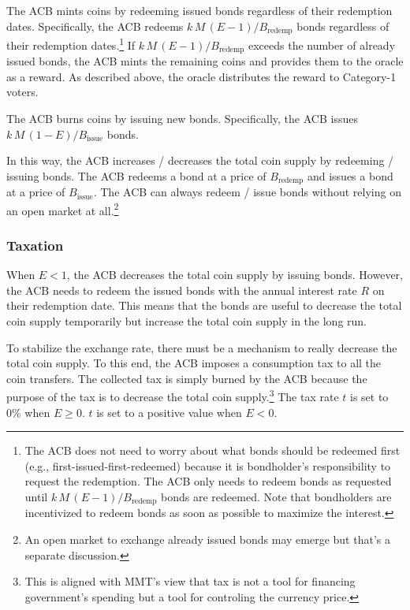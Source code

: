 \documentclass[dvipdfmx,a4paper]{article}
\begin{document}
The ACB mints coins by redeeming issued bonds regardless of their redemption dates. Specifically, the ACB redeems $k\,M\,(E-1)/B_{\mathrm{redemp}}$ bonds regardless of their redemption dates.\footnote{The ACB does not need to worry about what bonds should be redeemed first (e.g., first-issued-first-redeemed) because it is bondholder's responsibility to request the redemption. The ACB only needs to redeem bonds as requested until $k\,M\,(E-1)/B_{\mathrm{redemp}}$ bonds are redeemed. Note that bondholders are incentivized to redeem bonds as soon as possible to maximize the interest.} If $k\,M\,(E-1)/B_{\mathrm{redemp}}$ exceeds the number of already issued bonds, the ACB mints the remaining coins and provides them to the oracle as a reward. As described above, the oracle distributes the reward to Category-1 voters.

The ACB burns coins by issuing new bonds. Specifically, the ACB issues $k\,M\,(1-E)/B_{\mathrm{issue}}$ bonds.

In this way, the ACB increases / decreases the total coin supply by redeeming / issuing bonds. The ACB redeems a bond at a price of $B_{\mathrm{redemp}}$ and issues a bond at a price of $B_{\mathrm{issue}}$. The ACB can always redeem / issue bonds without relying on an open market at all.\footnote{An open market to exchange already issued bonds may emerge but that's a separate discussion.}

\subsubsection{Taxation}

When $E<1$, the ACB decreases the total coin supply by issuing bonds. However, the ACB needs to redeem the issued bonds with the annual interest rate $R$ on their redemption date. This means that the bonds are useful to decrease the total coin supply temporarily but increase the total coin supply in the long run.

To stabilize the exchange rate, there must be a mechanism to really decrease the total coin supply. To this end, the ACB imposes a consumption tax to all the coin transfers. The collected tax is simply burned by the ACB because the purpose of the tax is to decrease the total coin supply.\footnote{This is aligned with MMT's view that tax is not a tool for financing government's spending but a tool for controling the currency price.} The tax rate $t$ is set to 0\% when $E\ge 0$. $t$ is set to a positive value when $E<0$.
\end{document}
